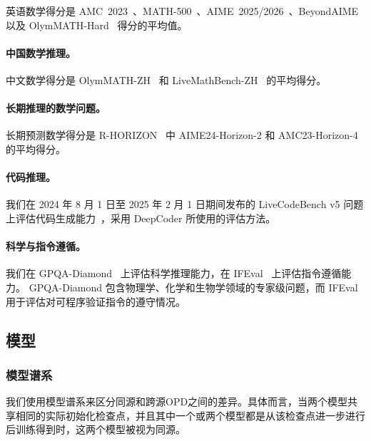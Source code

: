 英语数学得分是 AMC~2023~\cite{MAA_AMC}、MATH-500~\cite{hendrycks2021measuringmath500}、AIME~2025/2026~\cite{MAA_AIME}、BeyondAIME~\cite{bytedance_seed_2025_beyondaime} 以及 OlymMATH-Hard~\cite{sun2026olymmath} 得分的平均值。

\paragraph{中国数学推理。}

中文数学得分是 OlymMATH-ZH~\cite{sun2026olymmath} 和 LiveMathBench-ZH~\cite{liu2025livemathbench} 的平均得分。

\paragraph{长期推理的数学问题。}

长期预测数学得分是 R-HORIZON~\cite{lu2025r} 中 AIME24-Horizon-2 和 AMC23-Horizon-4 的平均得分。

\paragraph{代码推理。}

我们在 2024 年 8 月 1 日至 2025 年 2 月 1 日期间发布的 LiveCodeBench v5 问题上评估代码生成能力~\cite{jain2025livecodebench}，采用 DeepCoder 所使用的评估方法。


\paragraph{科学与指令遵循。}

我们在 GPQA-Diamond~\cite{rein2023gpqa} 上评估科学推理能力，在 IFEval~\cite{zhou2023instructionfollowingevaluationlargelanguage} 上评估指令遵循能力。  
GPQA-Diamond 包含物理学、化学和生物学领域的专家级问题，而 IFEval 用于评估对可程序验证指令的遵守情况。



\subsection{模型}
\label{sec:appendix_models}

\subsubsection{模型谱系}
\label{sec:appendix_model_lineage}

我们使用模型谱系来区分同源和跨源OPD之间的差异。具体而言，当两个模型共享相同的实际初始化检查点，并且其中一个或两个模型都是从该检查点进一步进行后训练得到时，这两个模型被视为同源。

